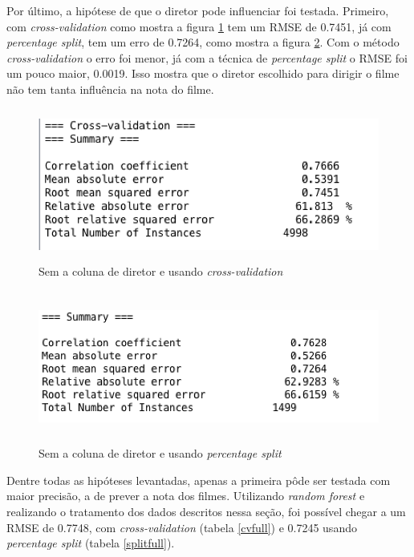 Por último, a hipótese de que o diretor pode influenciar foi testada. Primeiro, com \textit{cross-validation} como mostra a figura \ref{nodirectorcv} tem um RMSE de 0.7451, já com \textit{percentage split}, tem um erro de 0.7264, como mostra a figura \ref{nodirectorsplit}. Com o método \textit{cross-validation} o erro foi menor, já com a técnica de \textit{percentage split} o RMSE foi um pouco maior, 0.0019. Isso mostra que o diretor escolhido para dirigir o filme não tem tanta influência na nota do filme. 

\begin{figure}[H]
\centering
\includegraphics[height=5cm]{imagens/no_director_cv.png}
\caption{Sem a coluna de diretor e usando \textit{cross-validation}}
\label{nodirectorcv}
\end{figure}

\begin{figure}[H]
\centering
\includegraphics[height=5cm]{imagens/no_director_split.png}
\caption{Sem a coluna de diretor e usando \textit{percentage split}}
\label{nodirectorsplit}
\end{figure}

Dentre todas as hipóteses levantadas, apenas a primeira pôde ser testada com maior precisão, a de prever a nota dos filmes. Utilizando \textit{random forest} e realizando o tratamento dos dados descritos nessa seção, foi possível chegar a um RMSE de 0.7748, com \textit{cross-validation} (tabela \ref{cvfull}) e 0.7245 usando \textit{percentage split} (tabela \ref{splitfull}). 

